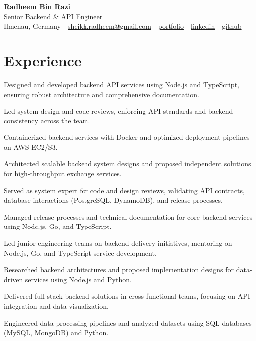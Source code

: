 \documentclass[11pt,a4paper]{resume}
\makeatletter
\newcommand{\Portfolio}{https://radheem.github.io/my-cv}
\newcommand{\PortfolioText}{portfolio}
\newcommand{\GitHub}{https://github.com/radheem}
\newcommand{\LinkedIn}{https://www.linkedin.com/in/radheem-razi}
\newcommand{\Email}{sheikh.radheem@gmail.com}
\makeatother
\begin{document}
\begin{center}
  {\huge\bfseries Radheem Bin Razi}\\[3pt]
  {\large Senior Backend \& API Engineer}\\[6pt]
  \small
  Ilmenau, Germany \,\textbar\,
  \href{mailto:\Email}{\Email} \,\textbar\,
  \href{\Portfolio}{\PortfolioText} \,\textbar\,
  \href{\LinkedIn}{linkedin} \,\textbar\,
  \href{\GitHub}{github}
\end{center}
\vspace{2pt}

\section{Experience}

\bullets
  \item Designed and developed backend API services using Node.js and TypeScript, ensuring robust architecture and comprehensive documentation.
  \item Led system design and code reviews, enforcing API standards and backend consistency across the team.
  \item Containerized backend services with Docker and optimized deployment pipelines on AWS EC2/S3.
\bulletsend
\vspace{3pt}
\bullets
  \item Architected scalable backend system designs and proposed independent solutions for high-throughput exchange services.
  \item Served as system expert for code and design reviews, validating API contracts, database interactions (PostgreSQL, DynamoDB), and release processes.
  \item Managed release processes and technical documentation for core backend services using Node.js, Go, and TypeScript.
  \item Led junior engineering teams on backend delivery initiatives, mentoring on Node.js, Go, and TypeScript service development.
\bulletsend
\vspace{3pt}
\bullets
  \item Researched backend architectures and proposed implementation designs for data-driven services using Node.js and Python.
  \item Delivered full-stack backend solutions in cross-functional teams, focusing on API integration and data visualization.
  \item Engineered data processing pipelines and analyzed datasets using SQL databases (MySQL, MongoDB) and Python.
\bulletsend
\vspace{3pt}
\end{document}
